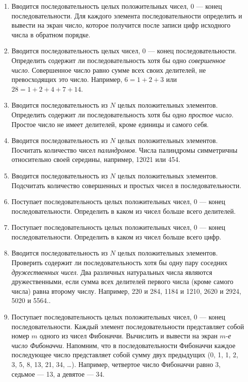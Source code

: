\begin{enumerate}
\item Вводится последовательность целых положительных чисел, 0 --- конец последовательности. Для каждого элемента
последовательности определить и вывести на экран число, которое получится после записи цифр исходного числа в обратном
порядке.
\item Вводится последовательность целых чисел, 0 --- конец последовательности. Определить содержит ли последовательность
хотя бы одно\emph{ совершенное число}. Совершенное число равно сумме всех своих делителей, не
превосходящих это число. Например, $6=1+2+3$ или $28=1+2+4+7+14$.
\item Вводится последовательность из $N$ целых положительных элементов. Определить содержит ли последовательность хотя бы
одно \emph{простое число}. Простое число не имеет делителей, кроме единицы и самого себя.
\item Вводится последовательность из $N$ целых положительных элементов. Посчитать количество чисел
\emph{палиндромов}. Числа палиндромы симметричны относительно своей середины, например, 12021 или 454.
\item Вводится последовательность из $N$ целых положительных элементов. Подсчитать количество совершенных и простых чисел
в последовательности.
\item Поступает последовательность целых положительных чисел, 0 --- конец последовательности. Определить в каком из чисел
больше всего делителей.
\item Поступает последовательность целых положительных чисел, 0 --- конец последовательности. Определить в каком из чисел
больше всего цифр. 
\item Вводится последовательность из $N$ целых положительных элементов. Проверить содержит ли последовательность хотя бы
одну пару соседних \emph{дружественных чисел}. Два различных натуральных числа являются дружественными,
если сумма всех делителей первого числа (кроме самого числа) равна второму числу. Например, 220 и 284, 1184 и 1210,
2620 и 2924, 5020 и 5564..
\item Поступает последовательность целых положительных чисел, 0 --- конец последовательности. 
Каждый элемент последовательности представляет собой номер $m$ одного из чисел Фибоначчи. 
Вычислить и вывести на экран \mbox{$m$-\emph{е}} \emph{число Фибоначчи}. Напомним, что в последовательности Фибоначчи 
каждое последующее число представляет собой сумму двух предыдущих (0, 1, 1, 2, 3, 5, 8, 13, 21, 34, \dots). 
Например, четвертое число Фибоначчи равно 3, седьмое --- 13, а девятое --- 34.

\end{enumerate}
